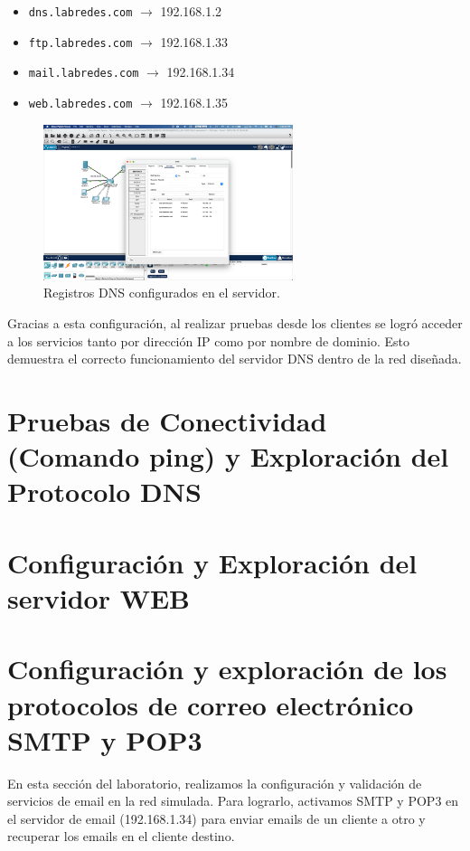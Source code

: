 \documentclass[10pt]{article}
\begin{document}
\begin{itemize}
    \item \texttt{dns.labredes.com} $\rightarrow$ 192.168.1.2
    \item \texttt{ftp.labredes.com} $\rightarrow$ 192.168.1.33
    \item \texttt{mail.labredes.com} $\rightarrow$ 192.168.1.34
    \item \texttt{web.labredes.com} $\rightarrow$ 192.168.1.35
\end{itemize}

\begin{figure}[H]
    \centering
    \includegraphics[width=0.65\textwidth]{lab-01-screenshots/42-1-DNS-config.png}
    \caption{Registros DNS configurados en el servidor.}
\end{figure}

\bigskip
Gracias a esta configuración, al realizar pruebas desde los clientes se logró acceder a los servicios tanto por dirección IP como por nombre de dominio. Esto demuestra el correcto funcionamiento del servidor DNS dentro de la red diseñada.



\section{Pruebas de Conectividad (Comando ping) y Exploración del Protocolo DNS}
\section{Configuración y Exploración del servidor WEB}
\section{Configuración y exploración de los protocolos de correo electrónico SMTP y POP3}
En esta sección del laboratorio, realizamos la configuración y validación de servicios de email en la red simulada. Para lograrlo, activamos SMTP y POP3 en el servidor de email (192.168.1.34) para enviar emails de un cliente a otro y recuperar los emails en el cliente destino.
\end{document}
